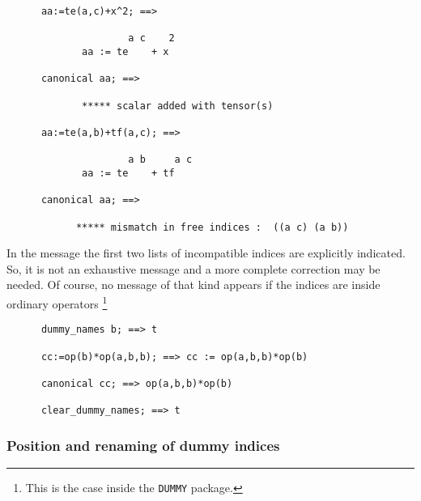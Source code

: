 \begin{verbatim}
      aa:=te(a,c)+x^2; ==>

                     a c    2
             aa := te    + x

      canonical aa; ==>

             ***** scalar added with tensor(s)

      aa:=te(a,b)+tf(a,c); ==>

                     a b     a c
             aa := te    + tf

      canonical aa; ==>

            ***** mismatch in free indices :  ((a c) (a b))
\end{verbatim}
In the message the first two lists of incompatible indices are 
explicitly indicated. So, it is not an exhaustive message and a more 
complete correction may be needed.
Of course, no message of that kind appears if the indices are inside 
ordinary operators%
\footnote{This is the case inside the \texttt{DUMMY} package.} 
\begin{verbatim}
      dummy_names b; ==> t

      cc:=op(b)*op(a,b,b); ==> cc := op(a,b,b)*op(b)

      canonical cc; ==> op(a,b,b)*op(b)    

      clear_dummy_names; ==> t
\end{verbatim}
\subsubsection{Position and renaming of dummy indices}

